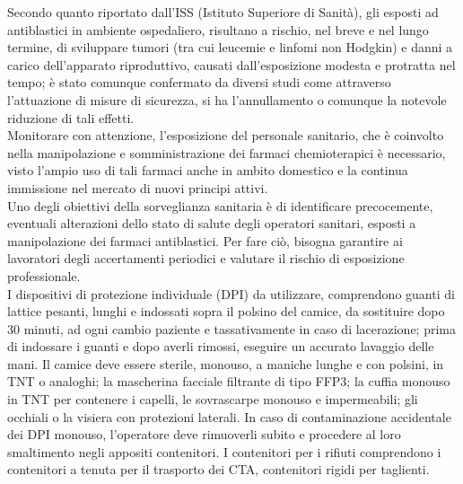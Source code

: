 Secondo quanto riportato dall’ISS (Istituto Superiore di Sanità), gli esposti ad antiblastici in ambiente 
ospedaliero, risultano a rischio, nel breve e nel lungo termine, di sviluppare tumori (tra cui leucemie e 
linfomi non Hodgkin) e danni a carico dell’apparato riproduttivo, causati dall’esposizione modesta e protratta nel 
tempo; è stato comunque confermato da diversi studi come attraverso l’attuazione di misure di sicurezza, 
si ha l’annullamento o comunque la notevole riduzione di tali effetti\cite{ISSESPO}.\\
Monitorare con attenzione, l’esposizione del personale sanitario, che è coinvolto nella manipolazione e 
somministrazione dei farmaci chemioterapici è necessario, visto l’ampio uso di tali farmaci 
anche in ambito domestico e la continua immissione nel mercato di nuovi principi attivi.\\
Uno degli obiettivi della sorveglianza sanitaria è di identificare precocemente, eventuali alterazioni dello stato 
di salute degli operatori sanitari, esposti a manipolazione dei farmaci antiblastici. Per fare ciò, 
bisogna garantire ai lavoratori degli accertamenti periodici e valutare il rischio di esposizione professionale\cite{ISSESPO}.\\

I dispositivi di protezione individuale (DPI) da utilizzare, comprendono guanti di lattice pesanti, lunghi e indossati 
sopra il polsino del camice, da sostituire dopo 30 minuti, ad ogni cambio paziente e tassativamente in caso di 
lacerazione; prima di indossare i guanti e dopo averli rimossi, eseguire un accurato lavaggio delle mani. 
Il camice deve essere sterile, monouso, a maniche lunghe e con polsini, in TNT o analoghi; la mascherina facciale 
filtrante di tipo FFP3; la cuffia monouso in TNT per contenere i capelli, le sovrascarpe monouso e impermeabili; 
gli occhiali o la visiera con protezioni laterali. In caso di contaminazione accidentale dei DPI monouso,
l’operatore deve rimuoverli subito e procedere al loro smaltimento negli appositi contenitori\cite{FNOPI}. 
I contenitori per i rifiuti comprendono i contenitori a tenuta per il trasporto dei CTA, 
contenitori rigidi per taglienti.\\

